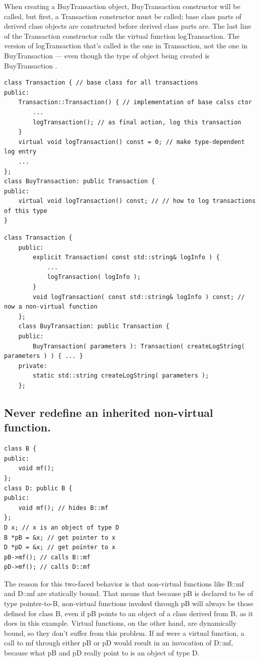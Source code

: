 \documentclass[a4paper,12pt,notitlepage]{article}
\begin{document}
When creating a BuyTransaction object, BuyTransaction constructor will be called, but first, a
Transaction constructor must be called; base class parts of derived class objects are constructed
before derived class parts are. The last line of the Transaction constructor calls the virtual
function logTransaction. The version of logTransaction that’s called is the one in Transaction, not
the one in BuyTransaction — even though the type of object being created is BuyTransaction \cite{Meyers_eff}.

\begin{verbatim}
class Transaction { // base class for all transactions
public:
    Transaction::Transaction() { // implementation of base calss ctor
        ...
        logTransaction(); // as final action, log this transaction
    }
    virtual void logTransaction() const = 0; // make type-dependent log entry
    ...
};
class BuyTransaction: public Transaction {
public:
    virtual void logTransaction() const; // // how to log transactions of this type
}
\end{verbatim}

\begin{verbatim}
class Transaction {
    public:
        explicit Transaction( const std::string& logInfo ) {
            ...
            logTransaction( logInfo );
        }
        void logTransaction( const std::string& logInfo ) const; // now a non-virtual function
    };
    class BuyTransaction: public Transaction {
    public:
        BuyTransaction( parameters ): Transaction( createLogString( parameters ) ) { ... }
    private:
        static std::string createLogString( parameters );
    };
\end{verbatim}


\subsection{Never redefine an inherited non-virtual function.}

\begin{verbatim}
class B {
public:
    void mf();
};
class D: public B {
public:
    void mf(); // hides B::mf
};
D x; // x is an object of type D
B *pB = &x; // get pointer to x
D *pD = &x; // get pointer to x
pB->mf(); // calls B::mf
pD->mf(); // calls D::mf
\end{verbatim}

The reason for this two-faced behavior is that non-virtual functions like B::mf and D::mf are statically bound. That means that because pB is declared to be of type pointer-to-B, non-virtual functions invoked through pB will always be those defined for class B, even if pB points to an object of a class derived from B, as it does in this example. Virtual functions, on the other hand, are dynamically bound, so they don't suffer from this problem. If mf were a virtual function, a call to mf through either pB or pD would result in an invocation of D::mf, because what pB and pD really point to is an object of type D.
\end{document}
